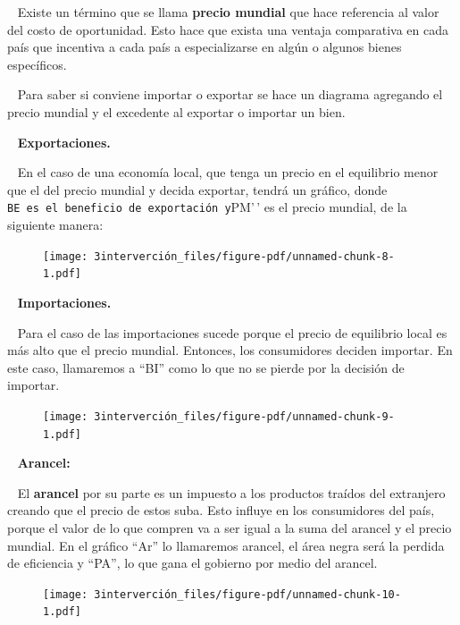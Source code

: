 \documentclass[
  letterpaper,
  DIV=11,
  numbers=noendperiod]{scrreport}
\begin{document}
~ Existe un término que se llama \textbf{precio mundial} que hace
referencia al valor del costo de oportunidad. Esto hace que exista una
ventaja comparativa en cada país que incentiva a cada país a
especializarse en algún o algunos bienes específicos.

~ Para saber si conviene importar o exportar se hace un diagrama
agregando el precio mundial y el excedente al exportar o importar un
bien.

~ \textbf{Exportaciones.}

~ En el caso de una economía local, que tenga un precio en el equilibrio
menor que el del precio mundial y decida exportar, tendrá un gráfico,
donde
\texttt{BE\textquotesingle{}\textquotesingle{}\ es\ el\ beneficio\ de\ exportación\ y}PM'\,'
es el precio mundial, de la siguiente manera:

\begin{figure}

{\centering \texttt{[image: 3interverción\_files/figure-pdf/unnamed-chunk-8-1.pdf]}

}

\end{figure}

~ \textbf{Importaciones.}

~ Para el caso de las importaciones sucede porque el precio de
equilibrio local es más alto que el precio mundial. Entonces, los
consumidores deciden importar. En este caso, llamaremos a ``BI'' como lo
que no se pierde por la decisión de importar.

\newpage

\begin{figure}

{\centering \texttt{[image: 3interverción\_files/figure-pdf/unnamed-chunk-9-1.pdf]}

}

\end{figure}

~ \textbf{Arancel:}

~ El \textbf{arancel} por su parte es un impuesto a los productos
traídos del extranjero creando que el precio de estos suba. Esto influye
en los consumidores del país, porque el valor de lo que compren va a ser
igual a la suma del arancel y el precio mundial. En el gráfico ``Ar'' lo
llamaremos arancel, el área negra será la perdida de eficiencia y
``PA'', lo que gana el gobierno por medio del arancel.

\begin{figure}

{\centering \texttt{[image: 3interverción\_files/figure-pdf/unnamed-chunk-10-1.pdf]}

}

\end{figure}
\end{document}
